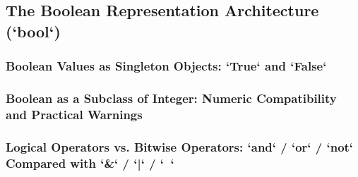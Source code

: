 \subsection{The Boolean Representation Architecture (`bool`)}
\subsubsection{Boolean Values as Singleton Objects: `True` and `False`}
\subsubsection{Boolean as a Subclass of Integer: Numeric Compatibility and Practical Warnings}
\subsubsection{Logical Operators vs. Bitwise Operators: `and` / `or` / `not` Compared with `&` / `|` / `~`}
